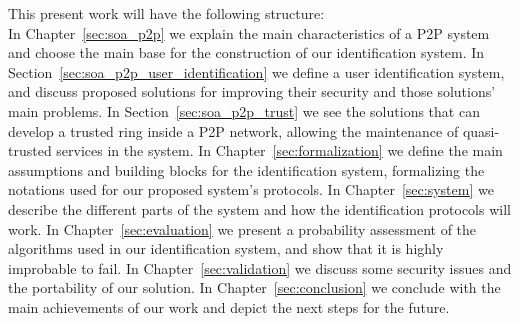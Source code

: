This present work will have the following structure:\\

In Chapter~\ref{sec:soa_p2p} we explain the
main characteristics of a P2P system and choose the main base for the
construction of our identification system. In
Section~\ref{sec:soa_p2p_user_identification}
we define a user identification system, and discuss proposed solutions for
improving their security and those solutions' main problems.
 In Section~\ref{sec:soa_p2p_trust} we see the solutions that can
develop a trusted ring inside a P2P network, allowing the maintenance of
quasi-trusted services in the system.  
In Chapter~\ref{sec:formalization} we define the main assumptions and building
blocks for the
identification system, formalizing the notations used for our proposed system's protocols.
In Chapter~\ref{sec:system}  we describe the different parts of the system and how the
identification protocols will work.
In Chapter~\ref{sec:evaluation} we present a probability assessment of
the algorithms used in our identification system, and show that it is highly
improbable to fail.
In Chapter~\ref{sec:validation} we discuss some security issues and the portability of our
solution.
In Chapter~\ref{sec:conclusion} we conclude with the main achievements of our work
and depict the next steps for the future.

